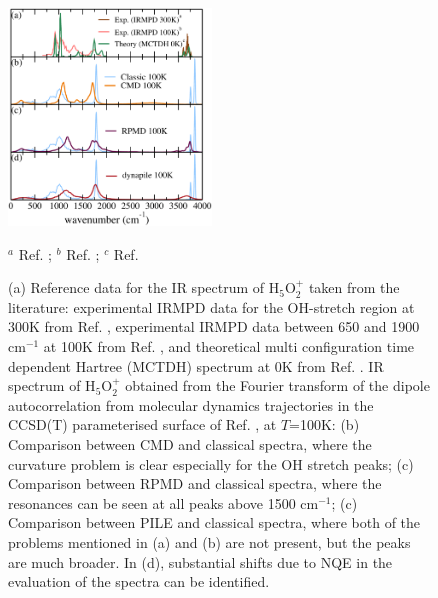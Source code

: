\documentclass[aps,prb,superscriptaddress,amsmath,amssymb,showpacs,twocolumn]{revtex4}
\begin{document}
\begin{figure}[htbp]
\begin{center}
\includegraphics[width=0.48\textwidth]{figures/zundel_cleanrot_cmd_rpmd_pile.pdf}
\end{center}
{\small {}$^a$ Ref. \cite{YehLee1989}; {}$^b$ Ref. \cite{AsmisScience2003}; {}$^c$ Ref. \cite{VendrellMeyer2007}}
\caption{(a) Reference data for the IR spectrum of H$_5$O$_2^+$ taken from the literature: experimental
IRMPD data for the OH-stretch region at 300K from Ref. \cite{YehLee1989}, experimental IRMPD data between 650 and 1900 cm$^{-1}$ 
at 100K from Ref. \cite{AsmisScience2003}, and theoretical multi configuration time dependent Hartree (MCTDH) spectrum at 0K from Ref. \cite{VendrellMeyer2007}.
IR spectrum of H$_5$O$_2^+$ obtained from the Fourier transform of the dipole autocorrelation from molecular 
dynamics trajectories in the CCSD(T) parameterised surface of Ref. \cite{HuangBraamsBowman2005}, at $T$=100K: 
(b) Comparison between CMD and classical spectra, where the curvature problem is clear especially for the OH stretch peaks; 
(c) Comparison between RPMD and classical spectra, where the resonances can be seen at all peaks above 1500 cm$^{-1}$; (c)
Comparison between PILE and classical spectra, where both of the problems mentioned in (a) and (b) are not present, but the peaks
are much broader. In (d), substantial shifts due to NQE in the evaluation of the spectra can be identified.}
\label{fig:zundel-spectra}
\end{figure}
\end{document}
